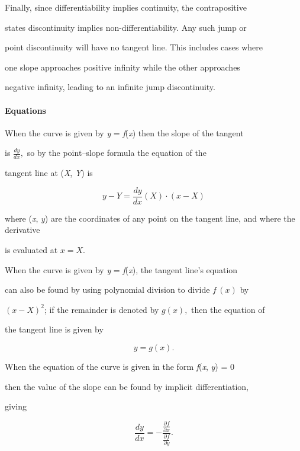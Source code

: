 {{{Finally, since differentiability implies continuity, the contrapositive

states discontinuity implies non-differentiability. Any such jump or

point discontinuity will have no tangent line. This includes cases where

one slope approaches positive infinity while the other approaches

negative infinity, leading to an infinite jump discontinuity.



\paragraph{Equations}



When the curve is given by \textit{y} = \textit{f}(\textit{x}) then the slope of the tangent

is $\frac{dy}{dx},$ so by the point--slope formula the equation of the

tangent line at (\textit{X}, \textit{Y}) is



$$y-Y=\frac{dy}{dx}(X) \cdot (x-X)$$ 



where (\textit{x}, \textit{y}) are the coordinates of any point on the tangent line, and where the derivative

is evaluated at $x=X.$



When the curve is given by \textit{y} = \textit{f}(\textit{x}), the tangent line's equation

can also be found by using polynomial division to divide $f \, (x)$ by

$(x-X)^2$; if the remainder is denoted by $g(x),$ then the equation of

the tangent line is given by



$$y=g(x).$$



When the equation of the curve is given in the form \textit{f}(\textit{x}, \textit{y}) = 0

then the value of the slope can be found by implicit differentiation,

giving



$$\frac{dy}{dx}=-\frac{\frac{\partial f}{\partial x}}{\frac{\partial f}{\partial y}}.$$



}}}
